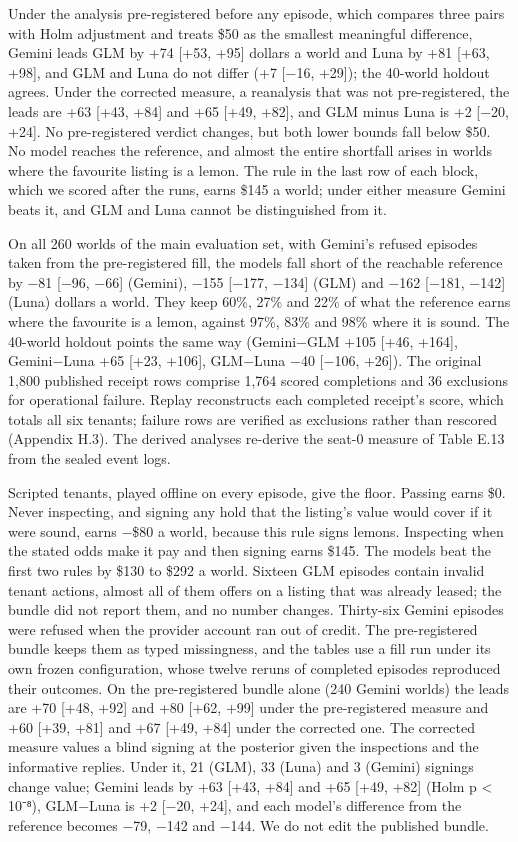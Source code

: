 Under the analysis pre-registered before any episode, which compares three pairs with Holm adjustment and
treats \$50 as the smallest meaningful difference, Gemini leads GLM by +74 {[}+53, +95{]} dollars a world and Luna by
+81 {[}+63, +98{]}, and GLM and Luna do not differ (+7 {[}−16, +29{]}); the 40-world holdout agrees. Under the corrected
measure, a reanalysis that was not pre-registered, the leads are +63 {[}+43, +84{]} and +65 {[}+49, +82{]}, and GLM minus
Luna is +2 {[}−20, +24{]}. No pre-registered verdict changes, but both lower bounds fall below \$50. No model reaches
the reference, and almost the entire shortfall arises in worlds where the favourite listing is a lemon. The rule
in the last row of each block, which we scored after the runs, earns \$145 a world; under either measure Gemini
beats it, and GLM and Luna cannot be distinguished from it.

On all 260 worlds of the main evaluation set, with Gemini's refused episodes taken from the pre-registered fill,
the models fall short of the reachable reference by −81 {[}−96, −66{]} (Gemini), −155 {[}−177, −134{]} (GLM) and −162
{[}−181, −142{]} (Luna) dollars a world. They keep 60\%, 27\% and 22\% of what the reference earns where the favourite is
a lemon, against 97\%, 83\% and 98\% where it is sound. The 40-world holdout points the same way (Gemini−GLM +105
{[}+46, +164{]}, Gemini−Luna +65 {[}+23, +106{]}, GLM−Luna −40 {[}−106, +26{]}). The original 1,800 published receipt rows
comprise 1,764 scored completions and 36 exclusions for operational failure. Replay reconstructs each completed
receipt's score, which totals all six tenants; failure rows are verified as exclusions rather than rescored
(Appendix H.3). The derived analyses re-derive the seat-0 measure of Table E.13 from the sealed event logs.

Scripted tenants, played offline on every episode, give the floor. Passing earns \$0. Never inspecting, and signing
any hold that the listing's value would cover if it were sound, earns −\$80 a world, because this rule signs lemons.
Inspecting when the stated odds make it pay and then signing earns \$145. The models beat the first two rules by
\$130 to \$292 a world. Sixteen GLM episodes contain invalid tenant actions, almost all of them offers on a listing
that was already leased; the bundle did not report them, and no number changes. Thirty-six Gemini episodes were
refused when the provider account ran out of credit. The pre-registered bundle keeps them as typed missingness,
and the tables use a fill run under its own frozen configuration, whose twelve reruns of completed episodes
reproduced their outcomes. On the pre-registered bundle alone (240 Gemini worlds) the leads are +70 {[}+48, +92{]}
and +80 {[}+62, +99{]} under the pre-registered measure and +60 {[}+39, +81{]} and +67 {[}+49, +84{]} under the corrected one.
The corrected measure values a blind signing at the posterior given the inspections and the informative replies.
Under it, 21 (GLM), 33 (Luna) and 3 (Gemini) signings change value; Gemini leads by +63 {[}+43, +84{]} and +65 {[}+49,
+82{]} (Holm p \textless{} 10⁻⁸), GLM−Luna is +2 {[}−20, +24{]}, and each model's difference from the reference becomes −79, −142
and −144. We do not edit the published bundle.

